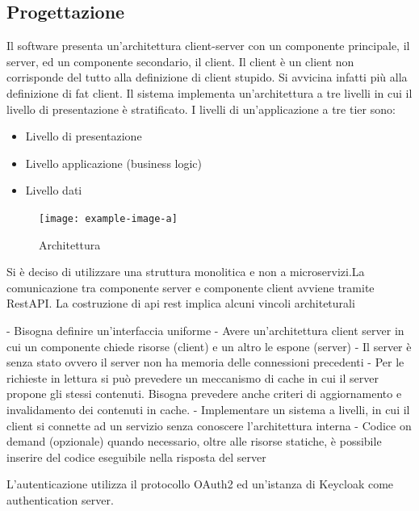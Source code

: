 \documentclass[a4paper,11pt]{article}
\begin{document}
\subsection{Progettazione}
Il software presenta un'architettura client-server con un componente principale, il server, ed un componente secondario, il client. Il client è un client non corrisponde del tutto alla definizione di client stupido. Si avvicina infatti più alla definizione di fat client.
Il sistema implementa un'architettura a tre livelli in cui il livello di presentazione è stratificato. I livelli di un'applicazione a tre tier sono:
\begin{itemize}
  \item Livello di presentazione
  \item Livello applicazione (business logic)
  \item Livello dati
\end{itemize}

\begin{figure}[H]
  \texttt{[image: example-image-a]}
  \caption{Architettura}
  \label{fig:architettura}
\end{figure}



Si è deciso di utilizzare una struttura monolitica e non a microservizi.La comunicazione tra componente server e componente client avviene tramite RestAPI. La costruzione di api rest implica alcuni vincoli architeturali \cite{restfulapiRESTArchitectural}

- Bisogna definire un'interfaccia uniforme
- Avere un'architettura client server in cui un componente chiede risorse (client) e un altro le espone (server)
- Il server è senza stato ovvero il server non ha memoria delle connessioni precedenti
- Per le richieste in lettura si può prevedere un meccanismo di cache in cui il server propone gli stessi contenuti. Bisogna prevedere anche criteri di aggiornamento e invalidamento dei contenuti in cache.
- Implementare un sistema a livelli, in cui il client si connette ad un servizio senza conoscere l'architettura interna
- Codice on demand (opzionale) quando necessario, oltre alle risorse statiche, è possibile inserire del codice eseguibile nella risposta del server

L'autenticazione utilizza il protocollo OAuth2 ed un'istanza di Keycloak come authentication server. \cite{ietf6749OAuth}
\end{document}

